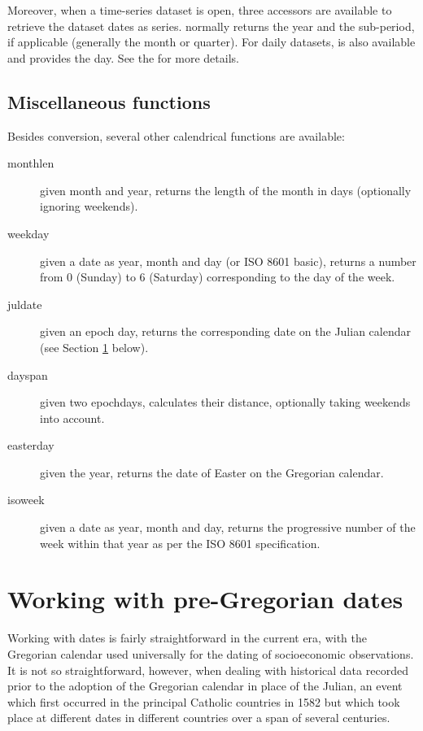 Moreover, when a time-series dataset is open, three accessors are
available to retrieve the dataset dates as series. 
normally returns the year and  the sub-period, if
applicable (generally the month or quarter). For daily datasets,
 is also available and provides the day. See the
\GCR{} for more details.

\subsection{Miscellaneous functions}
\label{sec:cal-misc}

Besides conversion, several other calendrical functions are available:
\begin{description}
\item[monthlen] given month and year, returns the length of the month
  in days (optionally ignoring weekends).
\item[weekday] given a date as year, month and day (or ISO 8601
  basic), returns a number from 0 (Sunday) to 6 (Saturday)
  corresponding to the day of the week.
\item[juldate] given an epoch day, returns the corresponding date on
  the Julian calendar (see Section \ref{sec:cal-conversion} below).
\item[dayspan] given two epochdays, calculates their distance,
  optionally taking weekends into account.
\item[easterday] given the year, returns the date of Easter on the
  Gregorian calendar.
\item[isoweek] given a date as year, month and day, returns the
  progressive number of the week within that year as per the ISO 8601
  specification.
\end{description}


\section{Working with pre-Gregorian dates}
\label{sec:cal-conversion}

Working with dates is fairly straightforward in the current era, with
the Gregorian calendar used universally for the dating of
socioeconomic observations. It is not so straightforward, however,
when dealing with historical data recorded prior to the adoption of
the Gregorian calendar in place of the Julian, an event which first
occurred in the principal Catholic countries in 1582 but which took
place at different dates in different countries over a span of several
centuries.

